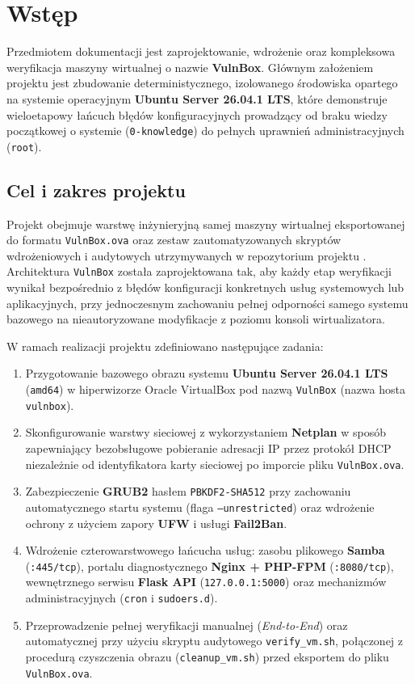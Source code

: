 \chapter{Wstęp}
\label{chap:wstep}

Przedmiotem dokumentacji jest zaprojektowanie, wdrożenie oraz kompleksowa weryfikacja maszyny wirtualnej o nazwie \textbf{VulnBox}. Głównym założeniem projektu jest zbudowanie deterministycznego, izolowanego środowiska opartego na systemie operacyjnym \textbf{Ubuntu Server 26.04.1 LTS}, które demonstruje wieloetapowy łańcuch błędów konfiguracyjnych prowadzący od braku wiedzy początkowej o systemie (\texttt{0-knowledge}) do pełnych uprawnień administracyjnych (\texttt{root}).

\section{Cel i zakres projektu}
\label{sec:cel-zakres}

Projekt obejmuje warstwę inżynieryjną samej maszyny wirtualnej eksportowanej do formatu \texttt{VulnBox.ova} \cite{ovf20} oraz zestaw zautomatyzowanych skryptów wdrożeniowych i audytowych utrzymywanych w repozytorium projektu \cite{vulnbox_repo}. Architektura \texttt{VulnBox} została zaprojektowana tak, aby każdy etap weryfikacji wynikał bezpośrednio z błędów konfiguracji konkretnych usług systemowych lub aplikacyjnych, przy jednoczesnym zachowaniu pełnej odporności samego systemu bazowego na nieautoryzowane modyfikacje z poziomu konsoli wirtualizatora.

W ramach realizacji projektu zdefiniowano następujące zadania:
\begin{enumerate}
    \item Przygotowanie bazowego obrazu systemu \textbf{Ubuntu Server 26.04.1 LTS} (\texttt{amd64}) w hiperwizorze Oracle VirtualBox pod nazwą \texttt{VulnBox} (nazwa hosta \texttt{vulnbox}).
    \item Skonfigurowanie warstwy sieciowej z wykorzystaniem \textbf{Netplan} w sposób zapewniający bezobsługowe pobieranie adresacji IP przez protokół DHCP niezależnie od identyfikatora karty sieciowej po imporcie pliku \texttt{VulnBox.ova}.
    \item Zabezpieczenie \textbf{GRUB2} hasłem \texttt{PBKDF2-SHA512} przy zachowaniu automatycznego startu systemu (flaga \texttt{--unrestricted}) oraz wdrożenie ochrony z użyciem zapory \textbf{UFW} i usługi \textbf{Fail2Ban}.
    \item Wdrożenie czterowarstwowego łańcucha usług: zasobu plikowego \textbf{Samba} (\texttt{:445/tcp}), portalu diagnostycznego \textbf{Nginx + PHP-FPM} (\texttt{:8080/tcp}), wewnętrznego serwisu \textbf{Flask API} (\texttt{127.0.0.1:5000}) oraz mechanizmów administracyjnych (\texttt{cron} i \texttt{sudoers.d}).
    \item Przeprowadzenie pełnej weryfikacji manualnej (\emph{End-to-End}) oraz automatycznej przy użyciu skryptu audytowego \texttt{verify\_vm.sh}, połączonej z procedurą czyszczenia obrazu (\texttt{cleanup\_vm.sh}) przed eksportem do pliku \texttt{VulnBox.ova}.
\end{enumerate}

